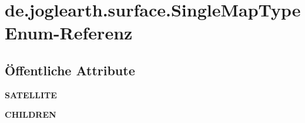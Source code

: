 \section{de.\-joglearth.\-surface.\-Single\-Map\-Type Enum-\/\-Referenz}
\label{enumde_1_1joglearth_1_1surface_1_1_single_map_type}
\subsection*{Öffentliche Attribute}
\begin{DoxyCompactItemize}
\item 
{\bfseries S\-A\-T\-E\-L\-L\-I\-T\-E}\label{enumde_1_1joglearth_1_1surface_1_1_single_map_type_a3469300dbf81c1be88648e86bac4a5bc}

\item 
{\bfseries C\-H\-I\-L\-D\-R\-E\-N}\label{enumde_1_1joglearth_1_1surface_1_1_single_map_type_a99a2050d224094c63d30584a3e65ac9f}

\end{DoxyCompactItemize}
